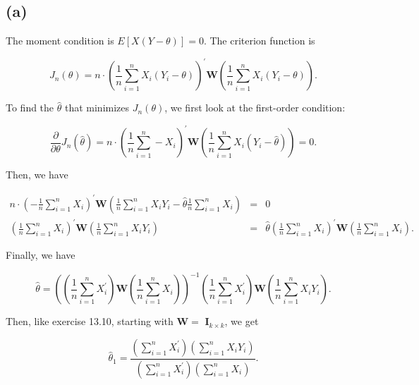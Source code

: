 \documentclass{article}
\begin{document}
\subsection*{(a)}

The moment condition is $E\left[ X\left( Y-\theta \right) \right] =0$. The
criterion function is

\begin{equation*}
J_{n}\left( \theta \right) =n\cdot \left( \frac{1}{n}\sum_{i=1}^{n}X_{i}%
\left( Y_{i}-\theta \right) \right) ^{\prime }\mathbf{W}\left( \frac{1}{n}%
\sum_{i=1}^{n}X_{i}\left( Y_{i}-\theta \right) \right) .
\end{equation*}

To find the $\hat{\theta}$ that minimizes $J_{n}\left( \theta \right) $, we
first look at the first-order condition:

\begin{equation*}
\frac{\partial }{\partial \theta }J_{n}\left( \hat{\theta}\right) =n\cdot
\left( \frac{1}{n}\sum_{i=1}^{n}-X_{i}\right) ^{\prime }\mathbf{W}\left( 
\frac{1}{n}\sum_{i=1}^{n}X_{i}\left( Y_{i}-\hat{\theta}\right) \right) =0.
\end{equation*}

Then, we have

\begin{eqnarray*}
n\cdot \left( -\frac{1}{n}\sum_{i=1}^{n}X_{i}\right) ^{\prime }\mathbf{W}%
\left( \frac{1}{n}\sum_{i=1}^{n}X_{i}Y_{i}-\hat{\theta}\frac{1}{n}%
\sum_{i=1}^{n}X_{i}\right) &=&0 \\
\left( \frac{1}{n}\sum_{i=1}^{n}X_{i}\right) ^{\prime }\mathbf{W}\left( 
\frac{1}{n}\sum_{i=1}^{n}X_{i}Y_{i}\right) &=&\hat{\theta}\left( \frac{1}{n}%
\sum_{i=1}^{n}X_{i}\right) ^{\prime }\mathbf{W}\left( \frac{1}{n}%
\sum_{i=1}^{n}X_{i}\right) .
\end{eqnarray*}

Finally, we have

\begin{equation*}
\hat{\theta}=\left( \left( \frac{1}{n}\sum_{i=1}^{n}X_{i}^{\prime }\right) 
\mathbf{W}\left( \frac{1}{n}\sum_{i=1}^{n}X_{i}\right) \right) ^{-1}\left( 
\frac{1}{n}\sum_{i=1}^{n}X_{i}^{\prime }\right) \mathbf{W}\left( \frac{1}{n}%
\sum_{i=1}^{n}X_{i}Y_{i}\right) .
\end{equation*}

Then, like exercise 13.10, starting with $\mathbf{W=}$ $\mathbf{I}_{k\times
k}$, we get

\begin{equation*}
\hat{\theta}_{1}=\frac{\left( \sum_{i=1}^{n}X_{i}^{\prime }\right) \left(
\sum_{i=1}^{n}X_{i}Y_{i}\right) }{\left( \sum_{i=1}^{n}X_{i}^{\prime
}\right) \left( \sum_{i=1}^{n}X_{i}\right) }.
\end{equation*}
\end{document}
